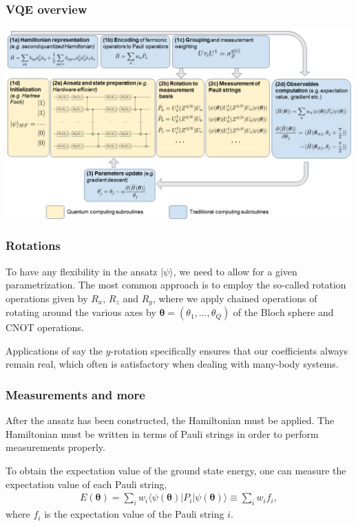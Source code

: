 \documentclass{beamer}
\begin{document}
\begin{frame}
\frametitle{VQE overview}

\vspace{6mm}

\centerline{\includegraphics[width=1.0\linewidth]{figures/vqe.png}}

\vspace{6mm}
\end{frame}

\begin{frame}
\frametitle{Rotations}

To have any flexibility in the
ansatz $\vert \psi\rangle$, we need to allow for a given parametrization. The most
common approach is to employ the so-called rotation operations given by $R_x$, $R_z$ and $R_y$, where we apply chained
operations of rotating around the various axes by $\boldsymbol{\theta} =
(\theta_1,\ldots,\theta_Q)$ of the Bloch sphere and CNOT operations.

Applications of say the $y$-rotation
specifically ensures that our coefficients always remain real, which
often is satisfactory when dealing with many-body systems.
\end{frame}

\begin{frame}
\frametitle{Measurements and more}

After the ansatz has been constructed, the Hamiltonian must
be applied. The Hamiltonian must be written in terms of
Pauli strings in order to perform measurements properly.

To obtain the expectation value
of the ground state energy, one can measure the expectation value of
each Pauli string, 
\begin{align*}
    E(\boldsymbol{\theta}) = \sum_i w_i\langle \psi(\boldsymbol{\theta})\vert P_i \vert \psi(\boldsymbol{\theta})\rangle \equiv \sum_i w_i f_i,
\end{align*}
where $f_i$ is the expectation value of the Pauli string $i$.
\end{frame}
\end{document}
